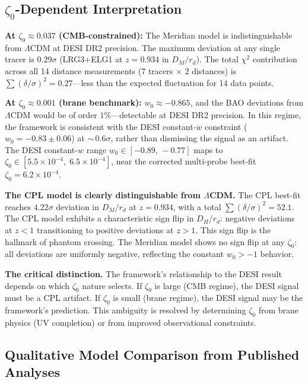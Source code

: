 \subsection{$\zeta_0$-Dependent Interpretation}
\label{sec:2-DESI-interp}

\textbf{At $\zeta_0 \approx 0.037$ (CMB-constrained):} The Meridian model is indistinguishable from $\Lambda$CDM at DESI DR2 precision. The maximum deviation at any single tracer is $0.29\sigma$ (LRG3+ELG1 at $z = 0.934$ in $D_M/r_d$). The total $\chi^2$ contribution across all 14 distance measurements ($7$ tracers $\times$ $2$ distances) is $\sum(\delta/\sigma)^2 = 0.27$---less than the expected fluctuation for 14 data points.

\textbf{At $\zeta_0 \approx 0.001$ (brane benchmark):} $w_0 \approx -0.865$, and the BAO deviations from $\Lambda$CDM would be of order $1\%$---detectable at DESI DR2 precision. In this regime, the framework is consistent with the DESI constant-$w$ constraint ($w_0 = -0.83 \pm 0.06$) at ${\sim}\,0.6\sigma$, rather than dismissing the signal as an artifact. The DESI constant-$w$ range $w_0 \in [-0.89,\, -0.77]$ maps to $\zeta_0 \in [5.5 \times 10^{-4},\; 6.5 \times 10^{-4}]$, near the corrected multi-probe best-fit $\zeta_0 = 6.2 \times 10^{-4}$.

\textbf{The CPL model is clearly distinguishable from $\Lambda$CDM.} The CPL best-fit reaches $4.22\sigma$ deviation in $D_M/r_d$ at $z = 0.934$, with a total $\sum(\delta/\sigma)^2 = 52.1$. The CPL model exhibits a characteristic sign flip in $D_H/r_d$: negative deviations at $z < 1$ transitioning to positive deviations at $z > 1$. This sign flip is the hallmark of phantom crossing. The Meridian model shows no sign flip at any $\zeta_0$: all deviations are uniformly negative, reflecting the constant $w_0 > -1$ behavior.

\textbf{The critical distinction.} The framework's relationship to the DESI result depends on which $\zeta_0$ nature selects. If $\zeta_0$ is large (CMB regime), the DESI signal must be a CPL artifact. If $\zeta_0$ is small (brane regime), the DESI signal may be the framework's prediction. This ambiguity is resolved by determining $\zeta_0$ from brane physics (UV completion) or from improved observational constraints.

\subsection{Qualitative Model Comparison from Published Analyses}
\label{sec:2-DESI-chi2}

